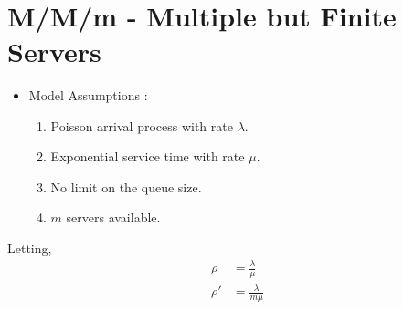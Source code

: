 \documentclass[11pt]{article}
\providecommand{\tightlist}{%
      \setlength{\itemsep}{0pt}\setlength{\parskip}{0pt}}
\begin{document}
    \begin{center}
    \end{center}
    { \hspace*{\fill} \\}
    
    \newpage
    \section{M/M/m - Multiple but Finite
Servers}
\begin{itemize}
\tightlist
\item
  Model Assumptions :

  \begin{enumerate}
  \def\labelenumi{\arabic{enumi}.}
  \tightlist
  \item
    Poisson arrival process with rate \(\lambda\).
  \item
    Exponential service time with rate \(\mu\).
  \item
    No limit on the queue size.
  \item
    \(m\) servers available.
  \end{enumerate}
\end{itemize}
Letting,
\begin{align}
\rho &= \frac{\lambda}{\mu} \\
\rho' &= \frac{\lambda}{m\mu} 
\end{align} 
\end{document}
